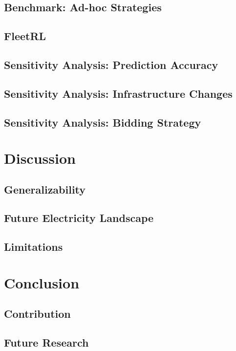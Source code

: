 \documentclass[a4paper, 12pt]{article}
\begin{document}
\subsection{Benchmark: Ad-hoc Strategies}
\label{sec:orgaf8cb2b}
\subsection{FleetRL}
\label{sec:org0ad18dd}
\subsection{Sensitivity Analysis: Prediction Accuracy}
\label{sec:org2206b43}
\subsection{Sensitivity Analysis: Infrastructure Changes}
\label{sec:org2f196e4}
\subsection{Sensitivity Analysis: Bidding Strategy}
\label{sec:orgbf62786}
\section{Discussion}
\label{sec:orgd46ce2d}
\subsection{Generalizability}
\label{sec:orgfd97378}
\subsection{Future Electricity Landscape}
\label{sec:org5f31f02}
\subsection{Limitations}
\label{sec:orga400ce1}
\section{Conclusion}
\label{sec:org8697745}
\subsection{Contribution}
\label{sec:orgb4cb8ab}
\subsection{Future Research}
\label{sec:orge9f62c2}


\clearpage


\end{document}
